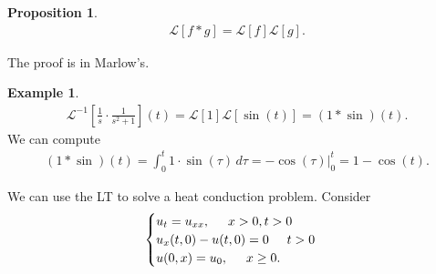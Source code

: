 \documentclass{article}
\theoremstyle{definition}
\newtheorem{prop}{Proposition}[section]
\newtheorem{exmp}{Example}[section]
\newcommand{\lag}{\mathcal{L}}
\newcommand{\f}[2]{\frac{#1}{#2}}
\newcommand{\lb}{\left[}
\newcommand{\rb}{\right]}
\begin{document}
\begin{prop}
	\begin{align*}
	\lag[f\ast g] = \lag[f]\lag[g].
	\end{align*}
	
	The proof is in Marlow's.
\end{prop}


\begin{exmp}
	\begin{align*}
	\lag^{-1}\lb \f{1}{s} \cdot \f{1}{s^2 + 1}\rb(t) = \lag[1]\lag[\sin(t)] = (1\ast \sin)(t).
	\end{align*}
	We can compute
	\begin{align*}
	(1\ast \sin)(t) = \int_0^t 1 \cdot \sin(\tau)\,d\tau = -\cos(\tau)\bigg\vert^t_0 = 1-\cos(t).
	\end{align*}
\end{exmp}


We can use the LT to solve a heat conduction problem. Consider
\begin{align*}
\begin{cases}
u_t = u_{xx}, \hspace{0.5cm} x>0, t>0\\
u_x(t,0) - u(t,0) = 0 \hspace{0.5cm} t>0\\
u(0,x) = u_0, \hspace{0.5cm} x\geq 0.
\end{cases}
\end{align*}
\end{document}
